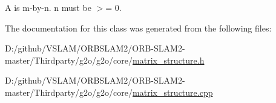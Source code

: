 A is m-\/by-\/n. n must be $>$= 0. 



The documentation for this class was generated from the following files\+:\begin{DoxyCompactItemize}
\item 
D\+:/github/\+V\+S\+L\+A\+M/\+O\+R\+B\+S\+L\+A\+M2/\+O\+R\+B-\/\+S\+L\+A\+M2-\/master/\+Thirdparty/g2o/g2o/core/\mbox{\hyperlink{matrix__structure_8h}{matrix\+\_\+structure.\+h}}\item 
D\+:/github/\+V\+S\+L\+A\+M/\+O\+R\+B\+S\+L\+A\+M2/\+O\+R\+B-\/\+S\+L\+A\+M2-\/master/\+Thirdparty/g2o/g2o/core/\mbox{\hyperlink{matrix__structure_8cpp}{matrix\+\_\+structure.\+cpp}}\end{DoxyCompactItemize}
